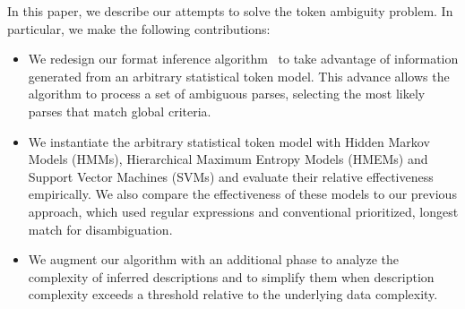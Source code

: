 In this paper, we describe our attempts to solve the token ambiguity problem.
In particular, we make the following contributions:
\begin{itemize}
\item We redesign our format inference algorithm~\cite{fisher+:dirttoshovels} 
to take advantage of information 
generated from an arbitrary statistical token model.
This advance allows the algorithm to process a set of
ambiguous parses, selecting the most likely parses that 
match global criteria.
\item We instantiate the arbitrary statistical token model with
Hidden Markov Models (HMMs), Hierarchical Maximum Entropy Models
(HMEMs) and Support Vector Machines (SVMs) and evaluate 
their relative effectiveness empirically.  We also compare the effectiveness of
these models to our previous approach, which used regular expressions
and conventional prioritized, longest match for disambiguation.
\item We augment our algorithm with an additional phase to
analyze the complexity of inferred descriptions and to simplify
them when description complexity exceeds a threshold relative to
the underlying data complexity.
\end{itemize}


